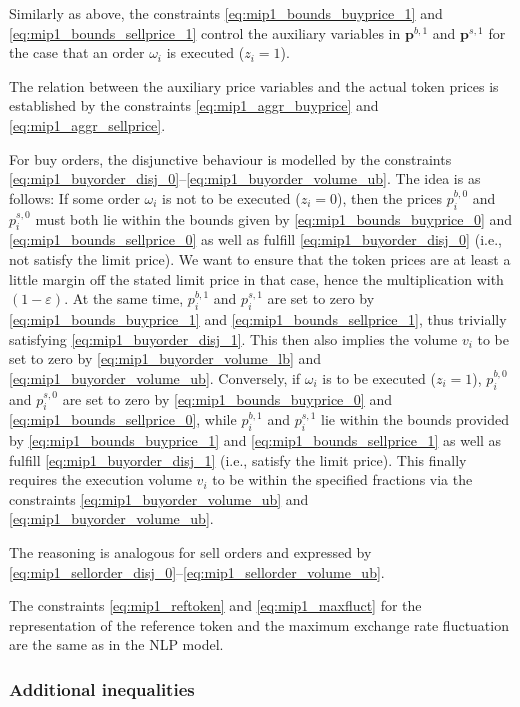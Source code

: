 \documentclass[11pt,parskip=full]{scrartcl}%
\newcommand*{\ie}{i.e., }
\begin{document}
Similarly as above, the constraints \eqref{eq:mip1_bounds_buyprice_1} and
\eqref{eq:mip1_bounds_sellprice_1} control the auxiliary variables in $ \mathbf{p}^{b,1} $ and $ 
\mathbf{p}^{s,1} $ for the case that an order $ \omega_i $ is executed ($ z_i = 1 $).

The relation between the auxiliary price variables and the actual token prices is established by
the constraints \eqref{eq:mip1_aggr_buyprice} and \eqref{eq:mip1_aggr_sellprice}.

For buy orders, the disjunctive behaviour is modelled by the constraints
\eqref{eq:mip1_buyorder_disj_0}--\eqref{eq:mip1_buyorder_volume_ub}.
The idea is as follows:
If some order $ \omega_i $ is not to be executed ($ z_i = 0 $), then the prices
$ p_i^{b,0} $ and $ p_i^{s,0} $ must both lie within the bounds given by
\eqref{eq:mip1_bounds_buyprice_0} and \eqref{eq:mip1_bounds_sellprice_0} as well as fulfill
\eqref{eq:mip1_buyorder_disj_0} (\ie not satisfy the limit price).
We want to ensure that the token prices are at least a little margin off the stated limit price in
that case, hence the multiplication with $ (1-\varepsilon) $.
At the same time, $ p_i^{b,1} $ and $ p_i^{s,1} $ are set to zero by
\eqref{eq:mip1_bounds_buyprice_1} and \eqref{eq:mip1_bounds_sellprice_1}, thus trivially satisfying
\eqref{eq:mip1_buyorder_disj_1}.
This then also implies the volume $ v_i $ to be set to zero by \eqref{eq:mip1_buyorder_volume_lb}
and \eqref{eq:mip1_buyorder_volume_ub}.
Conversely, if $ \omega_i $ is to be executed ($ z_i = 1 $), $ p_i^{b,0} $ and $ p_i^{s,0} $ are
set to zero by \eqref{eq:mip1_bounds_buyprice_0} and \eqref{eq:mip1_bounds_sellprice_0}, while
$ p_i^{b,1} $ and $ p_i^{s,1} $ lie within the bounds provided by \eqref{eq:mip1_bounds_buyprice_1}
and \eqref{eq:mip1_bounds_sellprice_1} as well as fulfill \eqref{eq:mip1_buyorder_disj_1}
(\ie satisfy the limit price).
This finally requires the execution volume $ v_i $ to be within the specified fractions via the
constraints \eqref{eq:mip1_buyorder_volume_ub} and \eqref{eq:mip1_buyorder_volume_ub}.

The reasoning is analogous for sell orders and expressed by
\eqref{eq:mip1_sellorder_disj_0}--\eqref{eq:mip1_sellorder_volume_ub}.

The constraints \eqref{eq:mip1_reftoken} and \eqref{eq:mip1_maxfluct} for the representation of the
reference token and the maximum exchange rate fluctuation are the same as in the NLP model.


\subsubsection*{Additional inequalities}
\end{document}
